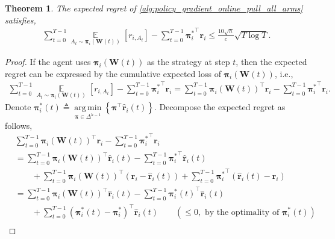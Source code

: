 \documentclass[10pt]{article}
\def\rvr{{\mathbf{r}}}
\newtheorem{thm}{Theorem}
\def\rvpi{{\boldsymbol{\pi}}}
\def\rmW{{\mathbf{W}}}
\def\sE{{\mathbb{E}}}
\DeclareMathOperator*{\argmin}{arg\,min}
\DeclareMathOperator*{\expectation}{\sE}
\begin{document}
\begin{thm}
\label{thm:sublinear_online_update_pull_all_arms}
    The expected regret of \cref{alg:policy_gradient_online_pull_all_arms} satisfies,
\begin{equation*}
\begin{split}
    \sum\limits_{t=0}^{T-1}{ \expectation\limits_{A_t \sim \rvpi_i\left(\rmW(t)\right)} \left[ r_{i, A_t} \right] } - \sum\limits_{t=0}^{T-1}{ {\rvpi_i^*}^\top \rvr_i } \le \frac{10 \sqrt{h}}{c}\sqrt{T \log{T}}.
\end{split}
\end{equation*}
\end{thm}
\begin{proof}
    If the agent uses $\rvpi_{i}\left(\rmW(t)\right)$ as the strategy at step $t$, then the expected regret can be expressed by the cumulative expected loss of $\rvpi_{i}\left(\rmW(t)\right)$, i.e.,
\begin{equation*}
\begin{split}
    \sum\limits_{t=0}^{T-1}{ \expectation\limits_{A_t \sim \rvpi_i\left(\rmW(t)\right)} \left[ r_{i, A_t} \right] } - \sum\limits_{t=0}^{T-1}{ {\rvpi_i^*}^\top \rvr_i } = \sum\limits_{t=0}^{T-1}{\rvpi_i\left(\rmW(t)\right)^\top \rvr_i} - \sum\limits_{t=0}^{T-1}{ {\rvpi_i^*}^\top \rvr_i }.
\end{split}
\end{equation*}
    Denote ${\rvpi_i^*(t)} \triangleq \argmin\limits_{\rvpi \in \Delta^{h-1}}{ \left\{ \rvpi^\top \hat{\rvr}_i(t) \right\} }$. Decompose the expected regret as follows,
\begin{equation}
\label{eq:cumulative_expected_loss_decomposition}
\begin{split}
    &\sum\limits_{t=0}^{T-1}{\rvpi_i\left(\rmW(t)\right)^\top \rvr_i} - \sum\limits_{t=0}^{T-1}{ {\rvpi_i^*}^\top \rvr_i } \\
    &= \sum\limits_{t=0}^{T-1}{ \rvpi_i\left(\rmW(t)\right)^\top \hat{\rvr}_i(t)} - \sum\limits_{t=0}^{T-1}{ {\rvpi_i^*}^\top \hat{\rvr}_i(t)} \\
    &\qquad + \sum\limits_{t=0}^{T-1}{ \rvpi_i\left(\rmW(t)\right)^\top \left( \rvr_i - \hat{\rvr}_i(t) \right) } + \sum\limits_{t=0}^{T-1}{ {\rvpi_i^*}^\top \left( \hat{\rvr}_i(t) - \rvr_i \right) } \\
    &= \sum\limits_{t=0}^{T-1}{ \rvpi_i\left(\rmW(t)\right)^\top \hat{\rvr}_i(t)} - \sum\limits_{t=0}^{T-1}{ {\rvpi_i^*(t)}^\top \hat{\rvr}_i(t)} \\
    &\qquad + \sum\limits_{t=0}^{T-1}{ \left( {\rvpi_i^*(t)} - {\rvpi_i^*} \right)^\top \hat{\rvr}_i(t) } \qquad \left( \le 0, \text{ by the optimality of } {\rvpi_i^*(t)} \right) \\

\end{split}
\end{equation}
\end{proof}
\end{document}
